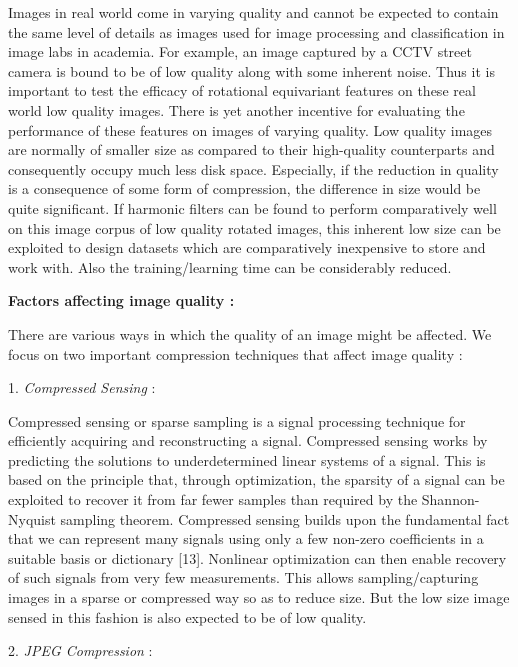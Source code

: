 \documentclass{article}
\begin{document}
Images in real world come in varying quality and cannot be expected to contain the same level of details as images used for image processing and classification in image labs in academia. For example, an image captured by a CCTV street camera is bound to be of low quality along with some inherent noise. Thus it is important to test the efficacy of rotational equivariant features on these real world low quality images. There is yet another incentive for evaluating the performance of these features on images of varying quality. Low quality images are normally of smaller size as compared to their high-quality counterparts and consequently occupy much less disk space. Especially, if the reduction in quality is a consequence of some form of compression, the difference in size would be quite significant. If harmonic filters can be found to perform comparatively well on this image corpus of low quality rotated images, this inherent low size can be exploited to design datasets which are comparatively inexpensive to store and work with. Also the training/learning time can be considerably reduced.

\textbf{Factors affecting image quality :}

There are various ways in which the quality of an image might be affected. We focus on two important compression techniques that affect image quality :

1.	\emph{Compressed Sensing} : 

Compressed sensing or sparse sampling is a signal processing technique for efficiently acquiring and reconstructing a signal. Compressed sensing works by predicting the solutions to underdetermined linear systems of a signal. This is based on the principle that, through optimization, the sparsity of a signal can be exploited to recover it from far fewer samples than required by the Shannon-Nyquist sampling theorem. Compressed sensing builds upon the fundamental fact that we can represent many signals using only a few non-zero coefficients in a suitable basis or dictionary [13]. Nonlinear optimization can then enable recovery of such signals from very few measurements. This allows sampling/capturing images in a sparse or compressed way so as to reduce size. But the low size image sensed in this fashion is also expected to be of low quality.

2.	\emph{ JPEG Compression }:
\end{document}
